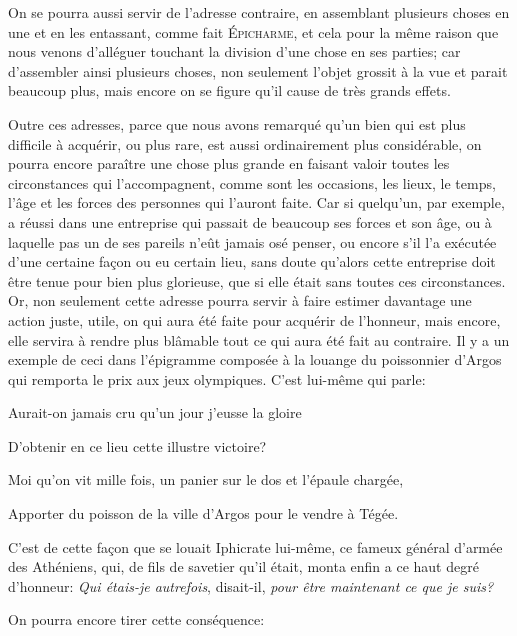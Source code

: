 \bigbreak

On se pourra aussi servir de l'adresse contraire, en assemblant plusieurs choses en une et en les entassant, comme fait
\textsc{Épicharme}, et cela pour la même raison que nous venons d'alléguer touchant la division d'une chose en ses
parties; car d'assembler ainsi plusieurs choses, non seulement l'objet grossit à la vue et parait beaucoup plus, mais
encore on se figure qu'il cause de très grands effets. 

\bigbreak

Outre ces adresses, parce que nous avons remarqué qu'un bien qui est plus difficile à acquérir, ou plus rare, est aussi
ordinairement plus considérable, on pourra encore paraître une chose plus grande en faisant valoir toutes les circonstances
qui l’accompagnent, comme sont les occasions, les lieux, le temps, l'âge et les forces des personnes qui l'auront faite. Car
si quelqu'un, par exemple, a réussi dans une entreprise qui passait de beaucoup ses forces et son âge, ou à laquelle pas un
de ses pareils n'eût jamais osé penser, ou encore s'il l'a exécutée d'une certaine façon ou eu certain lieu, sans doute
qu'alors cette entreprise doit être tenue pour bien plus glorieuse, que si elle était sans toutes ces circonstances. Or, non
seulement cette adresse pourra servir à faire estimer davantage une action juste, utile, on qui aura été faite pour acquérir
de l'honneur, mais encore, elle servira à rendre plus blâmable tout ce qui aura été fait au contraire. Il y a un exemple de
ceci dans l'épigramme composée à la louange du poissonnier d'Argos qui remporta le prix aux jeux olympiques. C'est lui-même
qui parle:

\begin{emphpar}
  Aurait-on jamais cru qu'un jour j'eusse la gloire

  D'obtenir en ce lieu cette illustre victoire?

  Moi qu'on vit mille fois, un panier sur le dos et l'épaule chargée,

  Apporter du poisson de la ville d'Argos pour le vendre à Tégée.
\end{emphpar}

C'est de cette façon que se louait Iphicrate lui-même, ce fameux général d'armée des Athéniens, qui, de fils de savetier
qu'il était, monta enfin a ce haut degré d'honneur: \emph{Qui étais-je autrefois}, disait-il, \emph{pour être maintenant
ce que je suis?}

\bigbreak

On pourra encore tirer cette conséquence:

